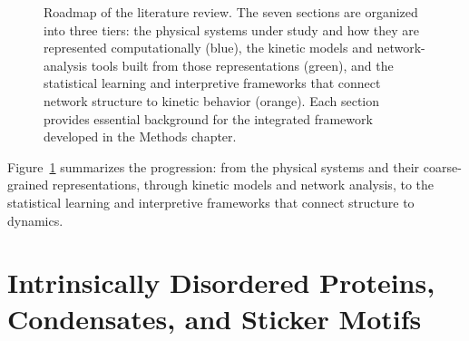 \begin{figure}[ht]
\caption{Roadmap of the literature review. The seven sections are organized into
three tiers: the physical systems under study and how they are represented
computationally (\textcolor{pastelblueborder}{blue}), the kinetic models and
network-analysis tools built from those representations
(\textcolor{pastelgreenborder}{green}), and the statistical learning and
interpretive frameworks that connect network structure to kinetic behavior
(\textcolor{pastelorangeborder}{orange}). Each section provides essential background
for the integrated framework developed in the Methods chapter.}
\label{fig:lit-review-roadmap}
\end{figure}

Figure~\ref{fig:lit-review-roadmap} summarizes the progression: from the physical
systems and their coarse-grained representations, through kinetic models and
network analysis, to the statistical learning and interpretive frameworks that
connect structure to dynamics.


\section{Intrinsically Disordered Proteins, Condensates, and Sticker Motifs}\label{sec:hexapeptides}

